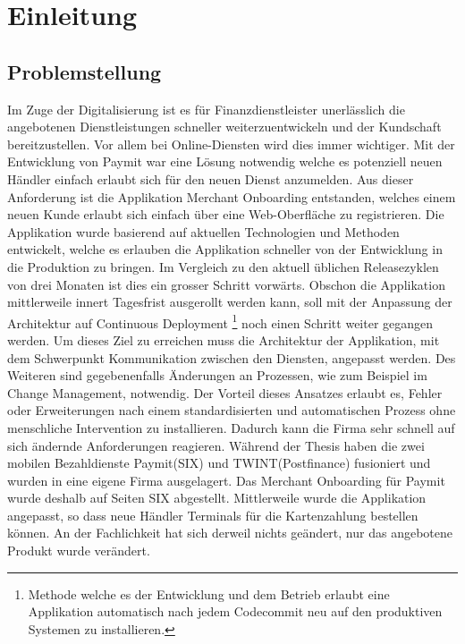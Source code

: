 \chapter{Einleitung}

\section{Problemstellung}

Im Zuge der Digitalisierung ist es für Finanzdienstleister unerlässlich die angebotenen Dienstleistungen schneller weiterzuentwickeln und der Kundschaft bereitzustellen. Vor allem bei Online-Diensten wird dies immer wichtiger. Mit der Entwicklung von Paymit war eine Lösung notwendig welche es potenziell neuen Händler einfach erlaubt sich für den neuen Dienst anzumelden. Aus dieser Anforderung ist die Applikation Merchant Onboarding entstanden, welches einem neuen Kunde erlaubt sich einfach über eine Web-Oberfläche zu registrieren. \newline
Die Applikation wurde basierend auf aktuellen Technologien und Methoden entwickelt, welche es erlauben die Applikation schneller von der Entwicklung in die Produktion zu bringen. Im Vergleich zu den aktuell üblichen Releasezyklen von drei Monaten ist dies ein grosser Schritt vorwärts.\newline
Obschon die Applikation mittlerweile innert Tagesfrist ausgerollt werden kann, soll mit der Anpassung der Architektur auf Continuous Deployment \footnote{Methode welche es der Entwicklung und dem Betrieb erlaubt eine Applikation automatisch nach jedem Codecommit neu auf den produktiven Systemen zu installieren.} noch einen Schritt weiter gegangen werden. Um dieses Ziel zu erreichen muss die Architektur der Applikation, mit dem Schwerpunkt Kommunikation zwischen den Diensten, angepasst werden. Des Weiteren sind gegebenenfalls Änderungen an Prozessen, wie zum Beispiel im Change Management, notwendig.
Der Vorteil dieses Ansatzes erlaubt es, Fehler oder Erweiterungen nach einem standardisierten und automatischen Prozess ohne menschliche Intervention zu installieren. Dadurch kann die Firma sehr schnell auf sich ändernde Anforderungen reagieren.\newline
Während der Thesis haben die zwei mobilen Bezahldienste Paymit(SIX) und TWINT(Postfinance) fusioniert und wurden in eine eigene Firma ausgelagert. Das Merchant Onboarding für Paymit wurde deshalb auf Seiten SIX abgestellt. Mittlerweile wurde die Applikation angepasst, so dass neue Händler Terminals für die Kartenzahlung bestellen können. An der Fachlichkeit hat sich derweil nichts geändert, nur das angebotene Produkt wurde verändert.\newline

